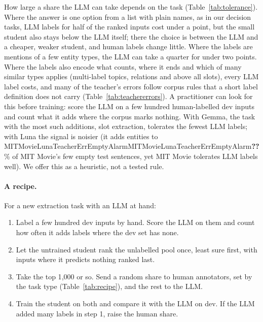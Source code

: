 \documentclass[11pt]{article}
\newcommand{\res}[1]{\ifcsname #1\endcsname\csname #1\endcsname\else\textbf{??}\fi}
\begin{document}
How large a share the LLM can take depends on the task (Table~\ref{tab:tolerance}). Where the answer is one option from a list with plain names, as in our decision tasks, LLM labels for half of the ranked inputs cost under a point, but the small student also stays below the LLM itself; there the choice is between the LLM and a cheaper, weaker student, and human labels change little. Where the labels are mentions of a few entity types, the LLM can take a quarter for under two points. Where the labels also encode what counts, where it ends and which of many similar types applies (multi-label topics, relations and above all slots), every LLM label costs, and many of the teacher's errors follow corpus rules that a short label definition does not carry (Table~\ref{tab:teachererrors}). A practitioner can look for this before training: score the LLM on a few hundred human-labelled dev inputs and count what it adds where the corpus marks nothing. With Gemma, the task with the most such additions, slot extraction, tolerates the fewest LLM labels; with Luna the signal is noisier (it adds entities to \res{MITMovieLunaTeacherErrEmptyAlarm}\% of MIT Movie's few empty test sentences, yet MIT Movie tolerates LLM labels well). We offer this as a heuristic, not a tested rule.

\paragraph{A recipe.} For a new extraction task with an LLM at hand:
\begin{enumerate}
\item Label a few hundred dev inputs by hand. Score the LLM on them and count how often it adds labels where the dev set has none.
\item Let the untrained student rank the unlabelled pool once, least sure first, with inputs where it predicts nothing ranked last.
\item Take the top 1{,}000 or so. Send a random share to human annotators, set by the task type (Table~\ref{tab:recipe}), and the rest to the LLM.
\item Train the student on both and compare it with the LLM on dev. If the LLM added many labels in step 1, raise the human share.
\end{enumerate}
\end{document}
